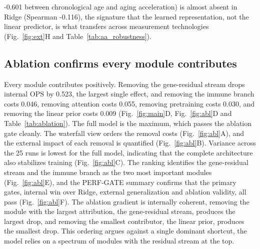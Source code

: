 \documentclass[unnumsec,webpdf,contemporary,large]{oup-authoring-template}
\begin{document}
-0.601 between chronological age and aging acceleration) is almost absent in Ridge (Spearman -0.116), the signature that the learned representation, not the linear predictor, is what transfers across measurement technologies (Fig.~\ref{fig:ext}H and Table~\ref{tab:aa_robustness}).

\subsection{Ablation confirms every module contributes}\label{sec:res4}
Every module contributes positively. Removing the gene-residual stream drops internal OPS by 0.523, the largest single effect, and removing the immune branch costs 0.046, removing attention costs 0.055, removing pretraining costs 0.030, and removing the linear prior costs 0.009 (Fig.~\ref{fig:main}D, Fig.~\ref{fig:abl}D and Table~\ref{tab:ablation}). The full model is the maximum, which passes the ablation gate cleanly. The waterfall view orders the removal costs (Fig.~\ref{fig:abl}A), and the external impact of each removal is quantified (Fig.~\ref{fig:abl}B). Variance across the 25 runs is lowest for the full model, indicating that the complete architecture also stabilizes training (Fig.~\ref{fig:abl}C). The ranking identifies the gene-residual stream and the immune branch as the two most important modules (Fig.~\ref{fig:abl}E), and the PERF-GATE summary confirms that the primary gates, internal win over Ridge, external generalization and ablation validity, all pass (Fig.~\ref{fig:abl}F). The ablation gradient is internally coherent, removing the module with the largest attribution, the gene-residual stream, produces the largest drop, and removing the smallest contributor, the linear prior, produces the smallest drop. This ordering argues against a single dominant shortcut, the model relies on a spectrum of modules with the residual stream at the top.
\end{document}
